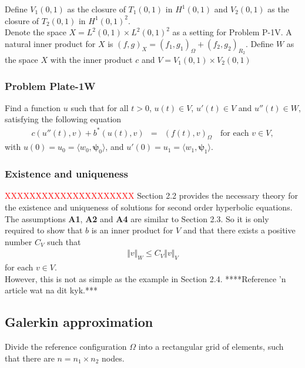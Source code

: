 \documentclass[../../main.tex]{subfiles}
\begin{document}
Define $V_1(0,1)$ as the closure of $T_1(0,1)$ in $H^1(0,1)$ and $V_2(0,1)$ as the closure of $T_2(0,1)$ in $H^1(0,1)^2$.\\

Denote the space $X = L^2(0,1)\times L^2(0,1)^2$ as a setting for Problem P-1V. A natural inner product for $X$ is $(f,g)_X = (f_1,g_1)_{\Omega} + (f_2,g_2)_{R_2}$.  Define $W$ as the space $X$ with the inner product $c$ and $V = V_1(0,1) \times V_2(0,1)$

\subsubsection{Problem Plate-1W}
Find a function $u$ such that for all $t>0$, $u(t) \in V$, $u'(t) \in V$ and $u''(t) \in W$, satisfying the following equation
\begin{eqnarray}
	c(u''(t),v) + b^*(u(t),v) & = & (f(t),v)_{\Omega} \ \ \ \textrm{ for each } v \in V,
\end{eqnarray} with $u(0)= u_0 = \langle w_0, \boldsymbol\psi_0 \rangle$, and $u'(0)= u_1 = \langle w_1, \boldsymbol\psi_1 \rangle$.\\

\subsubsection{Existence and uniqueness}
\textcolor{red}{XXXXXXXXXXXXXXXXXXXXX}
Section 2.2 provides the necessary theory for the existence and uniqueness of solutions for second order hyperbolic equations. The assumptions \textbf{A1}, \textbf{A2} and \textbf{A4} are similar to Section 2.3. So it is only required to show that $b$ is an inner product for $V$ and that there exists a positive number $C_V$ such that
\begin{eqnarray*}
	\Vert v\Vert_{W} \leq C_{V}\Vert v\Vert_{V}
\end{eqnarray*} for each $v \in V$.\\

However, this is not as simple as the example in Section 2.4. ****Reference 'n article wat na dit kyk.***

\subsection{Galerkin approximation}
Divide the reference configuration $\Omega$ into a rectangular grid of elements, such that there are $n = n_1 \times n_2$ nodes.\\
\end{document}
